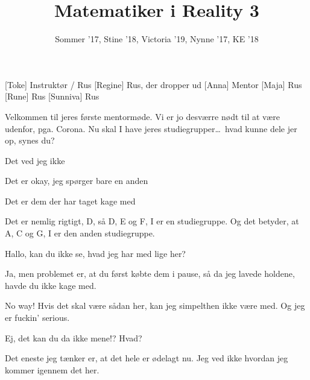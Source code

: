 \documentclass[a4paper,11pt]{article}
\title{Matematiker i Reality 3}
\author{Sommer '17, Stine '18, Victoria '19, Nynne '17, KE '18}
\begin{document}
\maketitle

\begin{roles}
[Toke] Instruktør / Rus
[Regine] Rus, der dropper ud
[Anna] Mentor
[Maja] Rus
[Rune] Rus
[Sunniva] Rus
\end{roles}

\begin{sketch}


 Velkommen til jeres første mentormøde. Vi er jo desværre nødt til at være udenfor, pga. Corona. Nu skal I have jeres studiegrupper\ldots\ hvad kunne dele jer op, synes du?


 Det ved jeg ikke


 Det er okay, jeg spørger bare en anden


 Det er dem der har taget kage med

 Det er nemlig rigtigt, D, så D, E og F, I er en studiegruppe. Og det betyder, at A, C og G, I er den anden studiegruppe.

 Hallo, kan du ikke se, hvad jeg har med lige her?


 Ja, men problemet er, at du først købte dem i pause, så da jeg lavede holdene, havde du ikke kage med.

 No way! Hvis det skal være sådan her, kan jeg simpelthen ikke være med. Og jeg er fuckin’ serious.

 Ej, det kan du da ikke mene!? Hvad?


 Det eneste jeg tænker er, at det hele er ødelagt nu. Jeg ved ikke hvordan jeg kommer igennem det her.



\end{sketch}
\end{document}
